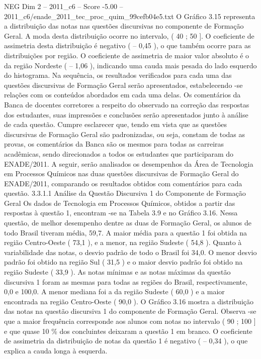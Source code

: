 \begin{textsample}{NEG Dim 2 – 2011\_c6 – Score -5.00 – 2011\_c6/enade\_2011\_tec\_proc\_quim\_99cefb04e5.txt}
O Gráfico 3.15 representa a distribuição das notas nas questões discursivas no componente de Formação Geral.
A moda desta distribuição ocorre no intervalo, ( 40 ; 50 ].
O coeficiente de assimetria desta distribuição é negativo ( – 0,45 ), o que também ocorre para as distribuições por região.
O coeficiente de assimetria de maior valor absoluto é o da região Nordeste ( – 1,06 ), indicando uma cauda mais pesada do lado esquerdo do histograma.
Na sequência, os resultados verificados para cada uma das questões discursivas de Formação Geral serão apresentados, estabelecendo -se relações com os conteúdos abordados em cada uma delas.
Os comentários da Banca de docentes corretores a respeito do observado na correção das respostas dos estudantes, suas impressões e conclusões serão apresentados junto à análise de cada questão.
Cumpre esclarecer que, tendo em vista que as questões discursivas de Formação Geral são padronizadas, ou seja, constam de todas as provas, os comentários da Banca são os mesmos para todas as carreiras acadêmicas, sendo direcionados a todos os estudantes que participaram do ENADE/2011.
A seguir, serão analisados os desempenhos da Área de Tecnologia em Processos Químicos nas duas questões discursivas de Formação Geral do ENADE/2011, comparando os resultados obtidos com comentários para cada questão. 3.3.1.1 Análise da Questão Discursiva 1 do Componente de Formação Geral Os dados de Tecnologia em Processos Químicos, obtidos a partir das respostas à questão 1, encontram -se na Tabela 3.9 e no Gráfico 3.16.
Nessa questão, de melhor desempenho dentre as duas de Formação Geral, os alunos de todo Brasil tiveram média, 59,7.
A maior média para a questão 1 foi obtida na região Centro-Oeste ( 73,1 ), e a menor, na região Sudeste ( 54,8 ).
Quanto à variabilidade das notas, o desvio padrão de todo o Brasil foi 34,0.
O menor desvio padrão foi obtido na região Sul ( 31,5 ) e o maior desvio padrão foi obtido na região Sudeste ( 33,9 ).
As notas mínimas e as notas máximas da questão discursiva 1 foram as mesmas para todas as regiões do Brasil, respectivamente, 0,0 e 100,0.
A menor mediana foi a da região Sudeste ( 60,0 ) e a maior encontrada na região Centro-Oeste ( 90,0 ).
O Gráfico 3.16 mostra a distribuição das notas na questão discursiva 1 do componente de Formação Geral.
Observa -se que a maior frequência corresponde aos alunos com notas no intervalo ( 90 ; 100 ] e que quase 10 \% dos concluintes deixaram a questão 1 em branco.
O coeficiente de assimetria da distribuição de notas da questão 1 é negativo ( – 0,34 ), o que explica a cauda longa à esquerda.

\end{textsample}
